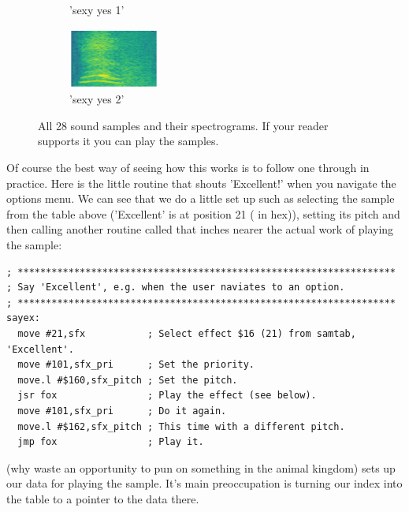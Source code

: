 \begin{figure}[H]
{\begin{subfigure}{0.247\textwidth}
{{        }\hspace*{0.75cm}%
      }%
      \caption*{'sexy yes 1'}
    \end{subfigure}
    \begin{subfigure}{0.247\textwidth}
      \includegraphics[width=3cm]{sounds/buttons/28.wav-button.png}%
      \caption*{'sexy yes 2'}
    \end{subfigure}
}\caption*{All 28 sound samples and their spectrograms. If your reader supports it you can play the samples.}
\end{figure}
Of course the best way of seeing how this works is to follow one through in practice. Here
is the little routine that shouts 'Excellent!' when you navigate the options menu. We can
see that we do a little set up such as selecting the sample from the table above ('Excellent'
is at position 21 ( in hex)), setting its pitch and then calling another routine
called  that inches nearer the actual work of playing the sample:

\begin{lstlisting}
; *******************************************************************
; Say 'Excellent', e.g. when the user naviates to an option.
; *******************************************************************
sayex:
  move #21,sfx           ; Select effect $16 (21) from samtab, 'Excellent'.
  move #101,sfx_pri      ; Set the priority.
  move.l #$160,sfx_pitch ; Set the pitch.
  jsr fox                ; Play the effect (see below).
  move #101,sfx_pri      ; Do it again.
  move.l #$162,sfx_pitch ; This time with a different pitch.
  jmp fox                ; Play it.
\end{lstlisting}

 (why waste an opportunity to pun on  something in the animal kingdom) sets
up our data for playing the sample. It's main preoccupation is turning our index into
the  table to a pointer to the data there.

